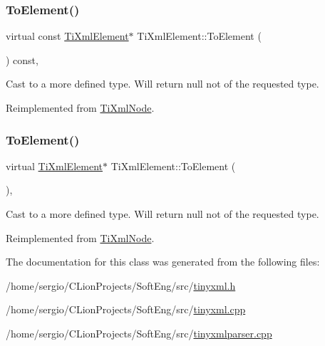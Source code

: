 \subsubsection{\texorpdfstring{To\+Element()}{ToElement()}\hspace{0.1cm}{\footnotesize\ttfamily [1/2]}}
{\footnotesize\ttfamily virtual const \hyperlink{class_ti_xml_element}{Ti\+Xml\+Element}$\ast$ Ti\+Xml\+Element\+::\+To\+Element (\begin{DoxyParamCaption}{ }\end{DoxyParamCaption}) const\hspace{0.3cm}{\ttfamily [inline]}, {\ttfamily [virtual]}}



Cast to a more defined type. Will return null not of the requested type. 



Reimplemented from \hyperlink{class_ti_xml_node_a4080428f2cac46e92ef4d284202fad0b}{Ti\+Xml\+Node}.

\mbox{\label{class_ti_xml_element_a9def86337ea7a755eb41cac980f60c7a}} 
\subsubsection{\texorpdfstring{To\+Element()}{ToElement()}\hspace{0.1cm}{\footnotesize\ttfamily [2/2]}}
{\footnotesize\ttfamily virtual \hyperlink{class_ti_xml_element}{Ti\+Xml\+Element}$\ast$ Ti\+Xml\+Element\+::\+To\+Element (\begin{DoxyParamCaption}{ }\end{DoxyParamCaption})\hspace{0.3cm}{\ttfamily [inline]}, {\ttfamily [virtual]}}



Cast to a more defined type. Will return null not of the requested type. 



Reimplemented from \hyperlink{class_ti_xml_node_aa65d000223187d22a4dcebd7479e9ebc}{Ti\+Xml\+Node}.



The documentation for this class was generated from the following files\+:\begin{DoxyCompactItemize}
\item 
/home/sergio/\+C\+Lion\+Projects/\+Soft\+Eng/src/\hyperlink{tinyxml_8h}{tinyxml.\+h}\item 
/home/sergio/\+C\+Lion\+Projects/\+Soft\+Eng/src/\hyperlink{tinyxml_8cpp}{tinyxml.\+cpp}\item 
/home/sergio/\+C\+Lion\+Projects/\+Soft\+Eng/src/\hyperlink{tinyxmlparser_8cpp}{tinyxmlparser.\+cpp}\end{DoxyCompactItemize}
